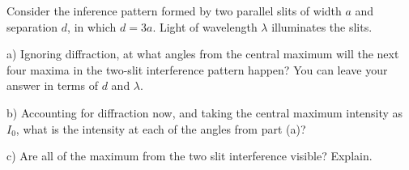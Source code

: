 \documentclass[10pt]{article}
\newenvironment{problem}[2][Problem]{\begin{trivlist}
\item[\hskip \labelsep {\bfseries #1}\hskip \labelsep {\bfseries #2.}]}{\end{trivlist}}
\begin{document}
\begin{problem}{5}
Consider the inference pattern formed by two parallel slits of width $a$ and separation $d$, in which $d=3a$. Light of wavelength $\lambda$ illuminates the slits.
\item a) Ignoring diffraction, at what angles from the central maximum will the next four maxima in the two-slit interference pattern happen? You can leave your answer in terms of $d$ and $\lambda$.
\item b) Accounting for diffraction now, and taking the central maximum intensity as $I_0$, what is the intensity at each of the angles from part (a)?
\item c) Are all of the maximum from the two slit interference visible? Explain.
\end{problem}




\end{document}
